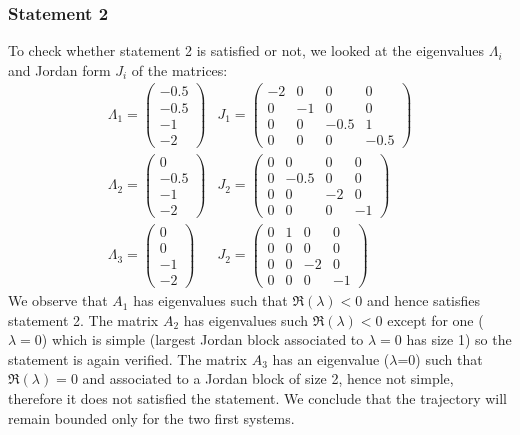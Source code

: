 \documentclass[11pt]{article}
\begin{document}
\subsubsection*{Statement 2}
To check whether statement 2 is satisfied or not, we looked at the eigenvalues $\Lambda_i$ and Jordan form $J_i$ of the matrices:
\begin{align*}
    \Lambda_1=\begin{pmatrix}
    -0.5\\
    -0.5\\
    -1\\
    -2
    \end{pmatrix}
    &
    J_1=\begin{pmatrix}
    -2 & 0 & 0 & 0\\
    0 &-1 & 0 & 0\\
    0 & 0 & -0.5 &1\\
    0 & 0 & 0 & -0.5
    \end{pmatrix}\\
    \Lambda_2=\begin{pmatrix}
    0\\
    -0.5\\
    -1\\
    -2
    \end{pmatrix}
    &
    J_2=\begin{pmatrix}
    0 & 0 & 0 & 0\\
    0 &-0.5 & 0 & 0\\
    0 & 0 & -2 & 0\\
    0 & 0 & 0 & -1
    \end{pmatrix}\\
    \Lambda_3=\begin{pmatrix}
    0\\
    0\\
    -1\\
    -2
    \end{pmatrix}
    &
    J_2=\begin{pmatrix}
    0 & 1 & 0 & 0\\
    0 & 0 & 0 & 0\\
    0 & 0 & -2 & 0\\
    0 & 0 & 0 & -1
    \end{pmatrix}
\end{align*}
We observe that $A_1$ has eigenvalues such that $\Re(\lambda)<0$ and hence satisfies statement 2. The matrix $A_2$ has eigenvalues such $\Re(\lambda)<0$ except for one ($\lambda=0$) which is simple (largest Jordan block associated to $\lambda=0$ has size 1) so the statement is again verified. The matrix $A_3$ has an eigenvalue ($\lambda$=0) such that $\Re(\lambda)=0$ and associated to a Jordan block of size 2, hence not simple, therefore it does not satisfied the statement. We conclude that the trajectory will remain bounded only for the two first systems.\\
\end{document}
